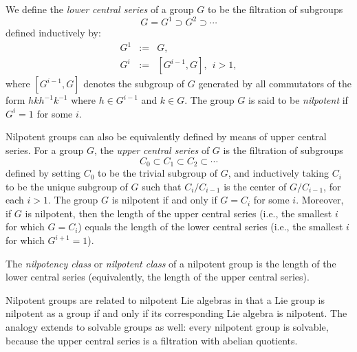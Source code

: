 \documentclass[12pt]{article}
\begin{document}
We define the {\em lower central series} of a group $G$ to be the filtration of subgroups
$$
G = G^1 \supset G^2 \supset \cdots
$$
defined inductively by:
\begin{eqnarray*}
G^1 & := & G, \\
G^i & := & [G^{i-1},G],\ \ i>1,
\end{eqnarray*}
where $[G^{i-1},G]$ denotes the subgroup of $G$ generated by all commutators of the form $hkh^{-1}k^{-1}$ where $h \in G^{i-1}$ and $k \in G$. The group $G$ is said to be {\em nilpotent} if $G^i = 1$ for some $i$.

Nilpotent groups can also be equivalently defined by means of upper central series. For a group $G$, the {\em upper central series} of $G$ is the filtration of subgroups
$$
C_0 \subset C_1 \subset C_2 \subset \cdots
$$
defined by setting $C_0$ to be the trivial subgroup of $G$, and inductively taking $C_i$ to be the unique subgroup of $G$ such that $C_i/C_{i-1}$ is the center of $G/C_{i-1}$, for each $i > 1$. The group $G$ is nilpotent if and only if $G = C_i$ for some $i$. Moreover, if $G$ is nilpotent, then the length of the upper central series (i.e., the smallest $i$ for which $G=C_i$) equals the length of the lower central series (i.e., the smallest $i$ for which $G^{i+1}=1$).

The \emph{nilpotency class} or \emph{nilpotent class} of a nilpotent group is the length of the lower central series (equivalently, the length of the upper central series).

Nilpotent groups are related to nilpotent Lie algebras in that a Lie group is nilpotent as a group if and only if its corresponding Lie algebra is nilpotent. The analogy extends to solvable groups as well: every nilpotent group is solvable, because the upper central series is a filtration with abelian quotients.
\end{document}
